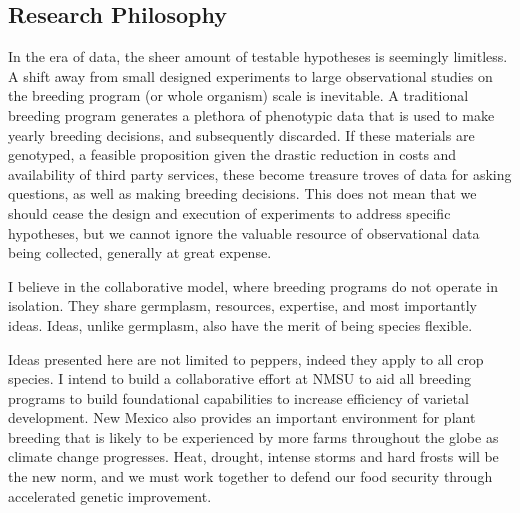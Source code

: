 \documentclass[11pt]{article}
\begin{document}
\subsection*{Research Philosophy}

In the era of data, the sheer amount of testable hypotheses is seemingly limitless. A shift away from small designed experiments to large observational studies on the breeding program (or whole organism) scale is inevitable. A traditional breeding program generates a plethora of phenotypic data that is used to make yearly breeding decisions, and subsequently discarded. If these materials are genotyped, a feasible proposition given the drastic reduction in costs and availability of third party services, these become treasure troves of data for asking questions, as well as making breeding decisions. This does not mean that we should cease the design and execution of experiments to address specific hypotheses, but we cannot ignore the valuable resource of observational data being collected, generally at great expense.

I believe in the collaborative model, where breeding programs do not operate in isolation. They share germplasm, resources, expertise, and most importantly ideas. Ideas, unlike germplasm, also have the merit of being species flexible. 

Ideas presented here are not limited to peppers, indeed they apply to all crop species. I intend to build a collaborative effort at NMSU to aid all breeding programs to build foundational capabilities to increase efficiency of varietal development. New Mexico also provides an important environment for plant breeding that is likely to be experienced by more farms throughout the globe as climate change progresses. Heat, drought, intense storms and hard frosts will be the new norm, and we must work together to defend our food security through accelerated genetic improvement. 
\end{document}
